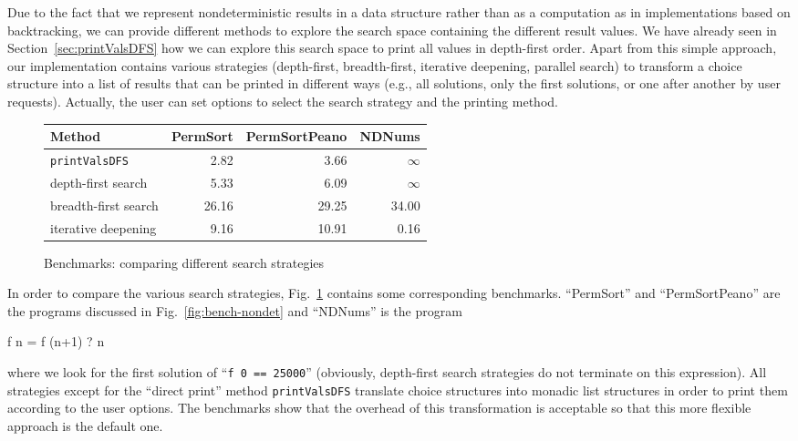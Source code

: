 \documentclass{llncs}
\newcommand{\code}[1]{\mbox{\small\texttt{#1}}}
\newcommand{\ccode}[1]{``\code{#1}''}
\begin{document}
Due to the fact that we represent nondeterministic results
in a data structure rather than as a computation as in implementations
based on backtracking, we can provide different methods to
explore the search space containing the different result values.
We have already seen in Section~\ref{sec:printValsDFS}
how we can explore this search space to print all values in
depth-first order.
Apart from this simple approach,
our implementation contains various strategies
(depth-first, breadth-first, iterative deepening, parallel search)
to transform a choice structure into a list of results
that can be printed in different ways (e.g., all solutions, only the first
solutions, or one after another by user requests).
Actually, the user can set options to select the search strategy and
the printing method.

\begin{figure}
\centering
\begin{tabular}{|@{~~}l@{~~}|*{3}{@{~~}r@{~~}|}}
\hline
Method               & PermSort & PermSortPeano &  NDNums \\\hline
\code{printValsDFS}  &    2.82  &         3.66  & $\infty$ \\
depth-first search   &    5.33  &         6.09  & $\infty$ \\
breadth-first search &   26.16  &        29.25  &    34.00 \\
iterative deepening  &    9.16  &        10.91  &     0.16 \\
\hline
\end{tabular}
\caption{Benchmarks: comparing different search strategies}
 \label{fig:search-strategies}
\end{figure}
%
In order to compare the various search strategies,
Fig.~\ref{fig:search-strategies} contains some corresponding
benchmarks.
``PermSort'' and ``PermSortPeano'' are the programs
discussed in Fig.~\ref{fig:bench-nondet} and ``NDNums'' is the program
\begin{curry}
  f n = f (n+1) ? n
\end{curry}
where we look for the first solution of \ccode{f 0 == 25000}
(obviously, depth-first search strategies do not terminate on this
expression).
All strategies except for the ``direct print'' method \code{printValsDFS}
translate choice structures into monadic list structures
in order to print them according to the user options.
The benchmarks show that the overhead of this transformation
is acceptable so that this more flexible approach is the default one.
\end{document}
